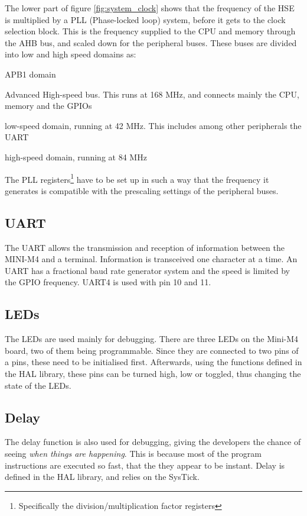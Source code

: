 The lower part of figure \ref{fig:system_clock} shows that the frequency
of the HSE is multiplied by a PLL (Phase-locked loop) system, before it gets
to the clock selection block. This is the frequency supplied to
the CPU and memory through the AHB bus, and scaled down for the peripheral buses.
These buses are divided into low and high speed domains as:

\begin{labeling}{APB1 domain}
	\item[\textbf{AHB}]
		Advanced High-speed bus. This runs at 168 MHz, and connects
		mainly the CPU, memory and the GPIOs
	\item[\textbf{APB1 domain}]
		low-speed domain, running at 42 MHz. This includes among other
		peripherals the UART
	\item[\textbf{APB2 domain}]
		high-speed domain, running at 84 MHz
	\end{labeling}

The PLL registers\footnote{Specifically the division/multiplication
factor registers}
have to be set up in such a way that the frequency it
generates is compatible with the prescaling settings of the peripheral
buses.


\subsection{UART}
The UART allows the transmission and reception of information between the MINI-M4 and a terminal.
Information is transceived one character at a time.
An UART has a fractional baud rate generator system and the speed is limited by the GPIO frequency.
UART4 is used with pin 10 and 11.


\subsection{LEDs}
The LEDs are used mainly for debugging. There are three LEDs on the
Mini-M4 board, two of them being programmable. Since they are connected
to two pins of a pins, these need to be initialised first.
Afterwards, using the functions defined in the HAL library, these pins can be
turned high, low or toggled, thus changing the state of the LEDs.


\subsection{Delay}
\label{ssec:delay}
The delay function is also used for debugging, giving the developers the
chance of seeing \textit{when things are happening}. This is because most of the
program instructions are executed so fast, that the they appear to be
instant.
Delay is defined in the HAL library, and relies on the SysTick.

